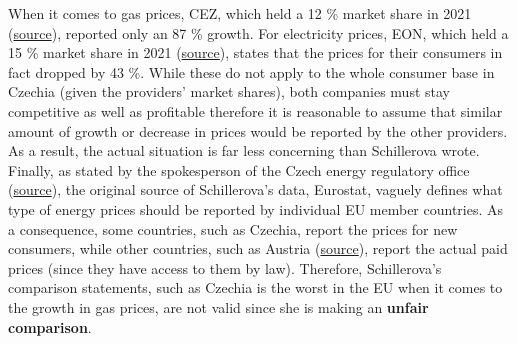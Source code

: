 \documentclass[fleqn,12pt]{article}
\begin{document}
When it comes to gas prices, CEZ, which held a 12 \% market share in 2021 (\href{https://ekonomickydenik.cz/cez-a-innogy-posiluji-podil-na-proridlem-trhu-s-elektrinou-a-plynem/}{source}), reported only an 87 \% growth.
For electricity prices, EON, which held a 15 \% market share in 2021 (\href{https://ekonomickydenik.cz/cez-a-innogy-posiluji-podil-na-proridlem-trhu-s-elektrinou-a-plynem/}{source}), 
states that the prices for their consumers in fact dropped by 43 \%. While these do not apply to the whole 
consumer base in Czechia (given the providers' market shares), both companies must stay competitive as well as profitable therefore it is reasonable to assume that similar 
amount of growth or decrease in prices would be reported by the other providers. As a result, the actual situation is far less concerning than Schillerova wrote. 
Finally, as stated by the spokesperson of the Czech energy regulatory office 
(\href{https://www.idnes.cz/ekonomika/domaci/cena-plyn-cesko-lonsky-rust-eurostat.A230426_124224_ekonomika_vebe}{source}), 
the original source of Schillerova's data, Eurostat, vaguely defines what type of energy prices should be reported by individual EU member countries. 
As a consequence, some countries, such as Czechia, report the prices for new consumers, 
while other countries, such as Austria (\href{https://www.idnes.cz/ekonomika/domaci/eurostat-ceny-plynu-statistika-petr-fiala.A230428_162329_ekonomika_ihal}{source}), 
report the actual paid prices (since they have access to them by law). 
Therefore, Schillerova's comparison statements, such as Czechia is the worst in the EU when it comes to the growth in gas prices, are not valid since she is making an \textbf{unfair comparison}.
\newpage

\end{document}
